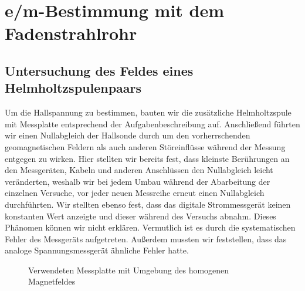 \chapter{e/m-Bestimmung mit dem Fadenstrahlrohr}
\label{emBestimmung}
\section{Untersuchung des Feldes eines Helmholtzspulenpaars}
\label{HemholtzspulenpaarUntersuchung}
Um die Hallspannung zu bestimmen, bauten wir die zusätzliche Helmholtzspule mit Messplatte entsprechend der Aufgabenbeschreibung auf. Anschließend führten wir einen Nullabgleich der Hallsonde durch um den vorherrschenden geomagnetischen Feldern als auch anderen Störeinflüsse während der Messung entgegen zu wirken. Hier stellten wir bereits fest, dass kleinste Berührungen an den Messgeräten, Kabeln und anderen Anschlüssen den Nullabgleich leicht veränderten, weshalb wir bei jedem Umbau während der Abarbeitung der einzelnen Versuche, vor jeder neuen Messreihe erneut einen Nullabgleich durchführten. Wir stellten ebenso fest, dass das digitale Strommessgerät keinen konstanten Wert anzeigte und dieser während des Versuchs abnahm. Dieses Phänomen können wir nicht erklären. Vermutlich ist es durch die systematischen Fehler des Messgeräts aufgetreten. Außerdem mussten wir feststellen, dass das analoge Spannungsmessgerät ähnliche Fehler hatte.   

\begin{figure}[hbtp]
\centering
{}
\caption{Verwendeten Messplatte mit Umgebung des homogenen Magnetfeldes}
\label{fig:MessPlatte}
\end{figure}

